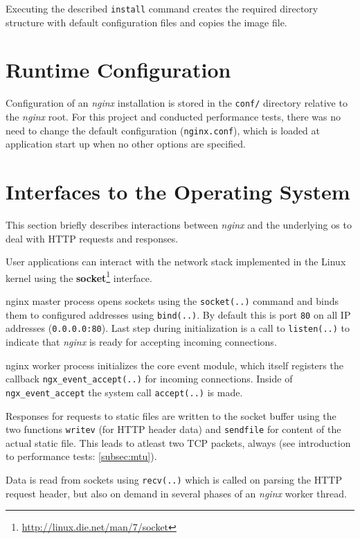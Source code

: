 Executing the described \texttt{install} command creates the required directory structure with default configuration files and copies the image file.

\section{Runtime Configuration}

Configuration of an \textit{nginx} installation is stored in the \texttt{conf/} directory relative to the \textit{nginx} root. For this project and conducted performance tests, there was no need to change the default configuration (\texttt{nginx.conf}), which is loaded at application start up when no other options are specified.

\section{Interfaces to the Operating System}
\label{sec:nginx-os-if}

This section briefly describes interactions between \textit{nginx} and the underlying \gls{os} to deal with HTTP requests and responses.

User applications can interact with the network stack implemented in the Linux kernel using the \textbf{socket}\footnote{\url{http://linux.die.net/man/7/socket}} interface.

nginx master process opens sockets using the \texttt{socket(..)} command and binds them to configured addresses using \texttt{bind(..)}. By default this is port \texttt{80} on all IP addresses (\texttt{0.0.0.0:80}). Last step during initialization is a call to \texttt{listen(..)} to indicate that \textit{nginx} is ready for accepting incoming connections.

nginx worker process initializes the core event module, which itself registers the callback \texttt{ngx\_event\_accept(..)} for incoming connections. Inside of \texttt{ngx\_event\_accept} the system call \texttt{accept(..)} is made.

Responses for requests to static files are written to the socket buffer using the two functions \texttt{writev} (for HTTP header data) and \texttt{sendfile} for content of the actual static file. This leads to atleast two TCP packets, always (see introduction to performance tests: \ref{subsec:mtu}).

Data is read from sockets using \texttt{recv(..)} which is called on parsing the HTTP request header, but also on demand in several phases of an \textit{nginx} worker thread.